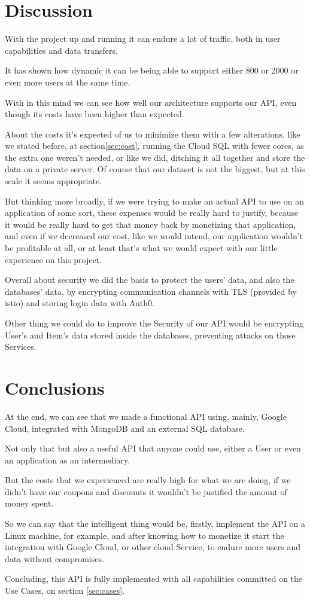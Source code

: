 \documentclass[oneside]{article}
\newcommand*\fpar{\hspace{1ex}}
\begin{document}
\section{Discussion}
\label{sec:discussion}
\fpar With the project up and running it can endure a lot of traffic, both in user capabilities and data transfers.
\par It has shown how dynamic it can be being able to support either 800 or 2000 or even more users at the same time.
\par With in this mind we can see how well our architecture supports our API, even though its costs have been higher than expected.
\par About the costs it's expected of us to minimize them with a few alterations, like we stated before, at section\ref{sec:cost}, running the Cloud SQL with fewer cores, as the extra one weren't needed, or like we did, ditching it all together and store the data on a private server. Of course that our dataset is not the biggest, but at this scale it seems appropriate.
\par But thinking more broadly, if we were trying to make an actual API to use on an application of some sort, these expenses would be really hard to justify, because it would be really hard to get that money back by monetizing that application, and even if we decreased our cost, like we would intend, our application wouldn't be profitable at all, or at least that's what we would expect with our little experience on this project.
\par Overall about security we did the basis to protect the users' data, and also the databases' data, by encrypting communication channels with TLS (provided by istio) and storing login data with Auth0. 
\par Other thing we could do to improve the Security of our API would be encrypting User's and Item's data stored inside the databases, preventing attacks on those Services.

\section{Conclusions}
\label{sec:conclusion}
\fpar At the end, we can see that we made a functional API using, mainly, Google Cloud, integrated with MongoDB and an external SQL database.
\par Not only that but also a useful API that anyone could use, either a User or even an application as an intermediary.
\par But the costs that we experienced are really high for what we are doing, if we didn't have our coupons and discounts it wouldn't be justified the amount of money spent.
\par So we can say that the intelligent thing would be, firstly, implement the API on a Linux machine, for example, and after knowing how to monetize it start the integration with Google Cloud, or other cloud Service, to endure more users and data without compromises.
\par Concluding, this API is fully implemented with all capabilities committed on the Use Cases, on section \ref{sec:cases}.
\end{document}
